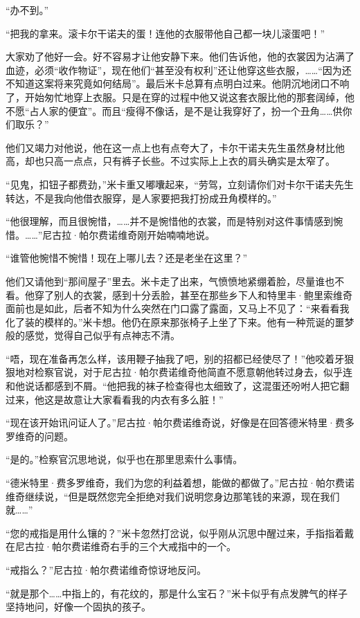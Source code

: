 \par “办不到。”
\par “把我的拿来。滚卡尔干诺夫的蛋！连他的衣服带他自己都一块儿滚蛋吧！”
\par 大家劝了他好一会。好不容易才让他安静下来。他们告诉他，他的衣裳因为沾满了血迹，必须“收作物证”，现在他们“甚至没有权利”还让他穿这些衣服，……“因为还不知道这案将来究竟如何结局”。最后米卡总算有点明白过来。他阴沉地闭口不响了，开始匆忙地穿上衣服。只是在穿的过程中他又说这套衣服比他的那套阔绰，他不愿“占人家的便宜”。而且“瘦得不像话，是不是让我穿好了，扮一个丑角……供你们取乐？”
\par 他们又竭力对他说，他在这一点上也有点夸大了，卡尔干诺夫先生虽然身材比他高，却也只高一点点，只有裤子长些。不过实际上上衣的肩头确实是太窄了。
\par “见鬼，扣钮子都费劲，”米卡重又嘟囔起来，“劳驾，立刻请你们对卡尔干诺夫先生转达，不是我向他借衣服穿，是人家要把我打扮成丑角模样的。”
\par “他很理解，而且很惋惜，……并不是惋惜他的衣裳，而是特别对这件事情感到惋惜。……”尼古拉·帕尔费诺维奇刚开始喃喃地说。
\par “谁管他惋惜不惋惜！现在上哪儿去？还是老坐在这里？”
\par 他们又请他到“那间屋子”里去。米卡走了出来，气愤愤地紧绷着脸，尽量谁也不看。他穿了别人的衣裳，感到十分丢脸，甚至在那些乡下人和特里丰·鲍里索维奇面前也是如此，后者不知为什么突然在门口露了露面，又马上不见了：“来看看我化了装的模样的。”米卡想。他仍在原来那张椅子上坐了下来。他有一种荒诞的噩梦般的感觉，觉得自己似乎有点神志不清。
\par “唔，现在准备再怎么样，该用鞭子抽我了吧，别的招都已经使尽了！”他咬着牙狠狠地对检察官说，对于尼古拉·帕尔费诺维奇他简直不愿意朝他转过身去，似乎连和他说话都感到不屑。“他把我的袜子检查得也太细致了，这混蛋还吩咐人把它翻过来，他这是故意让大家看看我的内衣有多么脏！”
\par “现在该开始讯问证人了。”尼古拉·帕尔费诺维奇说，好像是在回答德米特里·费多罗维奇的问题。
\par “是的。”检察官沉思地说，似乎也在那里思索什么事情。
\par “德米特里·费多罗维奇，我们为您的利益着想，能做的都做了。”尼古拉·帕尔费诺维奇继续说，“但是既然您完全拒绝对我们说明您身边那笔钱的来源，现在我们就……”
\par “您的戒指是用什么镶的？”米卡忽然打岔说，似乎刚从沉思中醒过来，手指指着戴在尼古拉·帕尔费诺维奇右手的三个大戒指中的一个。
\par “戒指么？”尼古拉·帕尔费诺维奇惊讶地反问。
\par “就是那个……中指上的，有花纹的，那是什么宝石？”米卡似乎有点发脾气的样子坚持地问，好像一个固执的孩子。
